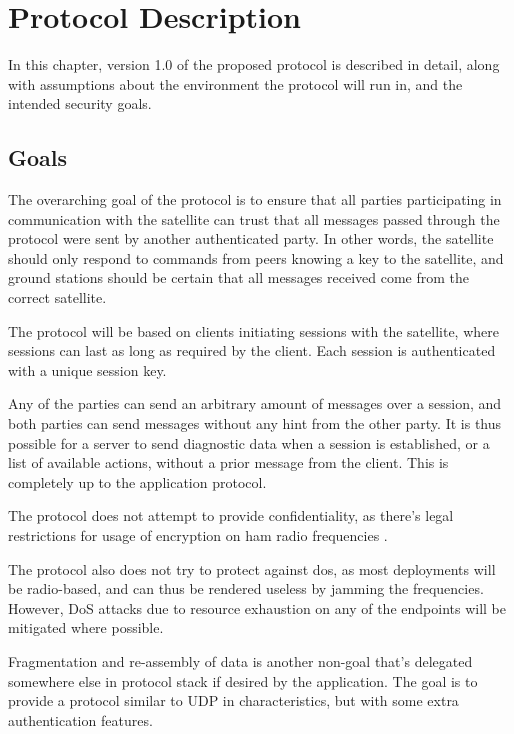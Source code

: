 \chapter{Protocol Description}
\label{chp:protocol-description}

In this chapter, version 1.0 of the proposed protocol is described in detail, along with assumptions about the environment the protocol will run in, and the intended security goals.


\section{Goals}\label{sec:goals}

The overarching goal of the protocol is to ensure that all parties participating in communication with the satellite can trust that all messages passed through the protocol were sent by another authenticated party. In other words, the satellite should only respond to commands from peers knowing a key to the satellite, and ground stations should be certain that all messages received come from the correct satellite.

The protocol will be based on clients initiating sessions with the satellite, where sessions can last as long as required by the client. Each session is authenticated with a unique session key.

Any of the parties can send an arbitrary amount of messages over a session, and both parties can send messages without any hint from the other party. It is thus possible for a server to send diagnostic data when a session is established, or a list of available actions, without a prior message from the client. This is completely up to the application protocol.

The protocol does not attempt to provide confidentiality, as there's legal restrictions for usage of encryption on ham radio frequencies \cite[article 25.2A, p.~295]{radio-regulations}.

The protocol also does not try to protect against \gls{dos}, as most deployments will be radio-based, and can thus be rendered useless by jamming the frequencies. However, DoS attacks due to resource exhaustion on any of the endpoints will be mitigated where possible.

Fragmentation and re-assembly of data is another non-goal that's delegated somewhere else in protocol stack if desired by the application. The goal is to provide a protocol similar to UDP in characteristics, but with some extra authentication features.


